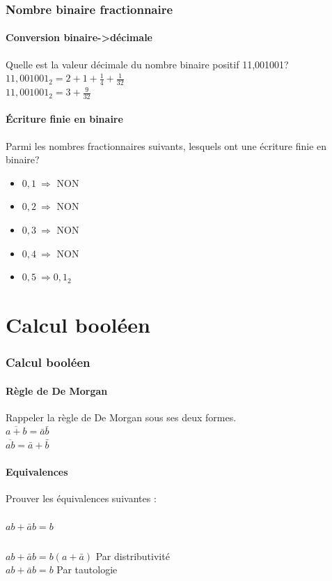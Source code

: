 \documentclass[10pt,a4paper]{article}
\begin{document}
\section{Nombre binaire fractionnaire}
\subsection{Conversion binaire->décimale}
Quelle est la valeur décimale du nombre binaire positif 11,001001?\\
$11,001001_{2} = 2 + 1 + \frac{1}{4} + \frac{1}{32}$\\
$11,001001_{2} = 3 + \frac{9}{32}$

\subsection{Écriture finie en binaire}
Parmi les nombres fractionnaires suivants, lesquels ont une écriture finie en binaire?\\
\begin{itemize}
\item $0,1\ \Rightarrow$ NON
\item $0,2\ \Rightarrow$ NON
\item $0,3\ \Rightarrow$ NON
\item $0,4\ \Rightarrow$ NON
\item $0,5\ \Rightarrow 0,1_{2}$
\end{itemize}
\part{Calcul booléen}
\section{Calcul booléen}
\subsection{Règle de De Morgan}
Rappeler la règle de De Morgan sous ses deux formes.\\
$\overline{a+b} = \bar{a}\bar{b}$\\
$\overline{ab} = \bar{a}+\bar{b}$

\subsection{Equivalences}
Prouver les équivalences suivantes :
\subsubsection{$ab+\bar{a}b = b$}
\begin{flushleft}
$ab+\bar{a}b = b(a+\bar{a})$ Par distributivité\\
$ab+\bar{a}b = b$ Par tautologie
\end{flushleft}
\end{document}
